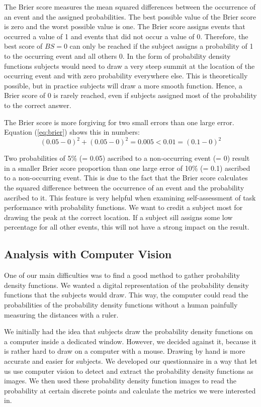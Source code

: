 \documentclass[../main/main.tex]{subfiles}
\begin{document}
	The Brier score measures the mean squared differences between the occurrence of an event and the assigned probabilities. The best possible value of the Brier score is zero and the worst possible value is one. The Brier score assigns events that occurred a value of 1 and events that did not occur a value of 0. Therefore, the best score of $BS = 0$ can only be reached if the subject assigns a probability of 1 to the occurring event and all others 0. In the form of probability density functions subjects would need to draw a very steep summit at the location of the occurring event and with zero probability everywhere else. This is theoretically possible, but in practice subjects will draw a more smooth function. Hence, a Brier score of 0 is rarely reached, even if subjects assigned most of the probability to the correct answer.
	
	The Brier score is more forgiving for two small errors than one large error. Equation (\ref{eq:brier}) shows this in numbers:
	\begin{equation}
		\label{eq:brier}
		(0.05 - 0)^2 + (0.05 - 0)^2 = 0.005 < 0.01 = (0.1 - 0)^2
	\end{equation}
	
	Two probabilities of 5\% (= 0.05) ascribed to a non-occurring event (= 0) result in a smaller Brier score proportion than one large error of 10\% (= 0.1) ascribed to a non-occurring event. This is due to the fact that the Brier score calculates the squared difference between the occurrence of an event and the probability ascribed to it. This feature is very helpful when examining self-assessment of task performance with probability functions. We want to credit a subject most for drawing the peak at the correct location. If a subject sill assigns some low percentage for all other events, this will not have a strong impact on the result.
	
	\subsection{Analysis with Computer Vision}
	\label{sec:computer_vision}
	
	One of our main difficulties was to find a good method to gather probability density functions. We wanted a digital representation of the probability density functions that the subjects would draw. This way, the computer could read the probabilities of the probability density functions without a human painfully measuring the distances with a ruler.
	
	We initially had the idea that subjects draw the probability density functions on a computer inside a dedicated window. However, we decided against it, because it is rather hard to draw on a computer with a mouse. Drawing by hand is more accurate and easier for subjects. We developed our questionnaire in a way that let us use computer vision to detect and extract the probability density functions as images. We then used these probability density function images to read the probability at certain discrete points and calculate the metrics we were interested in.
	
\end{document}
